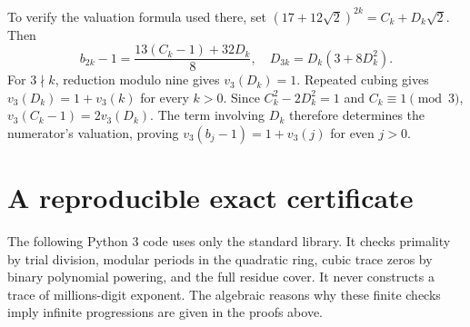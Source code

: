 \documentclass[11pt,a4paper]{article}
\theoremstyle{definition}\newtheorem{definition}[theorem]{Definition}
\theoremstyle{remark}\newtheorem{remark}[theorem]{Remark}
\begin{document}
To verify the valuation formula used there, set
$(17+12\sqrt2)^{2k}=C_k+D_k\sqrt2$. Then
\[
 b_{2k}-1=\frac{13(C_k-1)+32D_k}{8},\quad
 D_{3k}=D_k(3+8D_k^2).
\]
For $3\nmid k$, reduction modulo nine gives $v_3(D_k)=1$.
Repeated cubing gives $v_3(D_k)=1+v_3(k)$ for every $k>0$.
Since $C_k^2-2D_k^2=1$ and $C_k\equiv1\pmod3$,
$v_3(C_k-1)=2v_3(D_k)$. The term involving $D_k$ therefore
determines the numerator's valuation, proving
$v_3(b_j-1)=1+v_3(j)$ for even $j>0$.

\section{A reproducible exact certificate}
The following Python 3 code uses only the standard library. It
checks primality by trial division, modular periods in the quadratic
ring, cubic trace zeros by binary polynomial powering, and the full
residue cover. It never constructs a trace of millions-digit exponent.
The algebraic reasons why these finite checks imply infinite
progressions are given in the proofs above.
\end{document}
